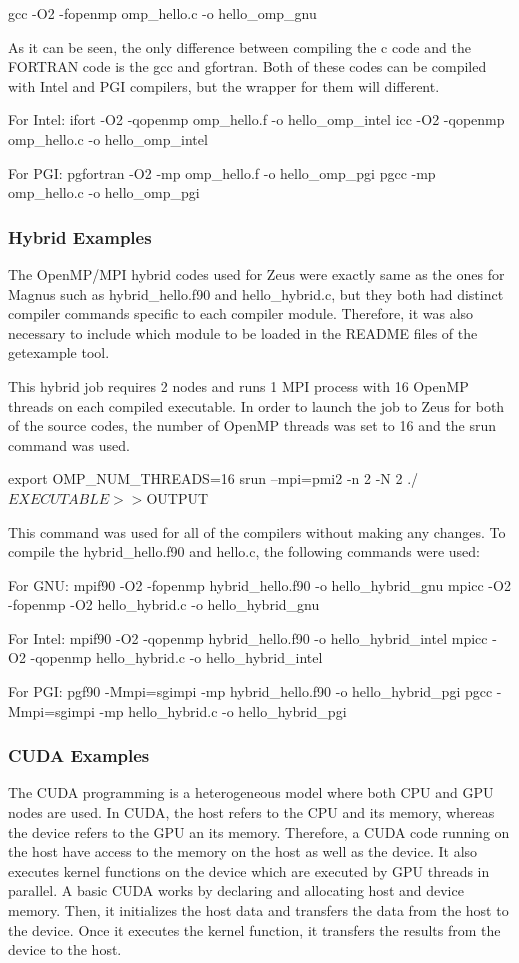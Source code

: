 \documentclass[journal]{IEEEtran}
\begin{document}
gcc -O2 -fopenmp omp_hello.c -o hello_omp_gnu

As it can be seen, the only difference between compiling the c code and the FORTRAN code is the gcc and gfortran. Both of these codes can be compiled
with Intel and PGI compilers, but the wrapper for them will different.

For Intel:
ifort -O2 -qopenmp omp_hello.f -o hello_omp_intel
icc -O2 -qopenmp omp_hello.c -o hello_omp_intel

For PGI:
pgfortran -O2 -mp omp_hello.f -o hello_omp_pgi
pgcc -mp omp_hello.c -o hello_omp_pgi


\subsubsection{Hybrid Examples}

The OpenMP/MPI hybrid codes used for Zeus were exactly same as the ones for Magnus such as hybrid_hello.f90 and hello_hybrid.c, but they both had
distinct compiler commands specific to each compiler module. Therefore, it was also necessary to include which module to be loaded in the README files
of the getexample tool.

This hybrid job requires 2 nodes and runs 1 MPI process with 16 OpenMP threads on each compiled executable. In order to launch the job to Zeus for both 
of the source codes, the number of OpenMP threads was set to 16 and the srun command was used.

export OMP_NUM_THREADS=16
srun --mpi=pmi2 -n 2 -N 2 ./$EXECUTABLE >> ${OUTPUT}

This command was used for all of the compilers without making any changes. To compile the hybrid_hello.f90 and hello.c, the following commands were used:

For GNU:
mpif90 -O2 -fopenmp hybrid_hello.f90 -o hello_hybrid_gnu
mpicc -O2 -fopenmp -O2 hello_hybrid.c -o hello_hybrid_gnu

For Intel:
mpif90 -O2 -qopenmp hybrid_hello.f90 -o hello_hybrid_intel
mpicc -O2 -qopenmp hello_hybrid.c -o hello_hybrid_intel

For PGI:
pgf90 -Mmpi=sgimpi -mp hybrid_hello.f90 -o hello_hybrid_pgi
pgcc -Mmpi=sgimpi -mp hello_hybrid.c -o hello_hybrid_pgi

\subsubsection{CUDA Examples}

The CUDA programming is a heterogeneous model where both CPU and GPU nodes are used. In CUDA, the host refers to the CPU and its memory, whereas the 
device refers to the GPU an its memory. Therefore, a CUDA code running on the host have access to the memory on the host as well as the device. It also 
executes kernel functions on the device which are executed by GPU threads in parallel. A basic CUDA works by declaring and allocating host and device 
memory. Then, it initializes the host data and transfers the data from the host to the device. Once it executes the kernel function, it transfers the 
results from the device to the host.
\end{document}
